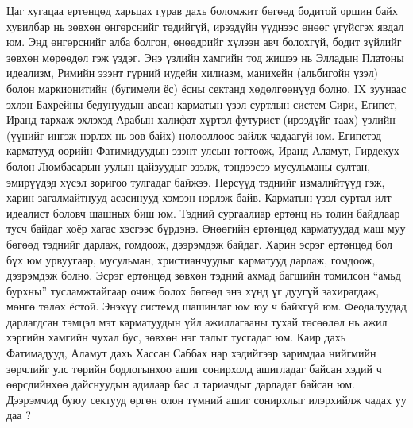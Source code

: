 Цаг хугацаа ертөнцөд харьцах гурав дахь боломжит бөгөөд бодитой оршин байх хувилбар нь зөвхөн өнгөрснийг төдийгүй, ирээдүйн үүднээс өнөөг үгүйсгэх явдал юм. Энд өнгөрснийг алба болгон, өнөөдрийг хүлээн авч болохгүй, бодит зүйлийг зөвхөн мөрөөдөл гэж үздэг. Энэ үзлийн хамгийн тод жишээ нь Элладын Платоны идеализм, Римийн эзэнт гүрний иудейн хилиазм, манихейн (альбигойн үзэл) болон маркионитийн (бугимели ёс) ёсны сектанд хөдөлгөөнүүд болно. IX зуунаас эхлэн Бахрейны бедунуудын авсан карматын үзэл суртлын систем Сири, Египет, Иранд тархаж эхлэхэд Арабын халифат хүртэл футурист (ирээдүйг таах) үзлийн (үүнийг ингэж нэрлэх нь зөв байх) нөлөөллөөс зайлж чадаагүй юм. Египетэд карматууд өөрийн Фатимидуудын эзэнт улсын тогтоож, Иранд Аламут, Гирдекух болон Люмбасарын уулын цайзуудыг эзэлж, тэндээсээ мусульманы султан, эмирүүдэд хүсэл зоригоо тулгадаг байжээ. Персүүд тэднийг измалийтүүд гэж, харин загалмайтнууд асасинууд хэмээн нэрлэж байв.
Карматын үзэл суртал илт идеалист боловч шашных биш юм. Тэдний сургаалиар ертөнц нь толин байдлаар тусч байдаг хоёр хагас хэсгээс бүрдэнэ. Өнөөгийн ертөнцөд карматуудад маш муу бөгөөд тэднийг дарлаж, гомдоож, дээрэмдэж байдаг. Харин эсрэг ертөнцөд бол бүх юм урвуугаар, мусульман, христианчуудыг карматууд дарлаж, гомдоож, дээрэмдэж болно. Эсрэг ертөнцөд зөвхөн тэдний ахмад багшийн томилсон “амьд бурхны” тусламжтайгаар очиж болох бөгөөд энэ хүнд үг дуугүй захирагдаж, мөнгө төлөх ёстой. Энэхүү системд шашинлаг юм юу ч байхгүй юм. Феодалуудад дарлагдсан тэмцэл мэт карматуудын үйл ажиллагааны тухай төсөөлөл нь ажил хэргийн хамгийн чухал бус, зөвхөн нэг талыг тусгадаг юм. Каир дахь Фатимадууд, Аламут дахь Хассан Саббах нар хэдийгээр заримдаа нийгмийн зөрчлийг улс төрийн бодлогынхоо ашиг сонирхолд ашигладаг байсан хэдий ч өөрсдийнхөө дайснуудын адилаар бас л тариачдыг дарладаг байсан юм. Дээрэмчид буюу сектууд өргөн олон түмний ашиг сонирхлыг илэрхийлж чадах уу даа ?
